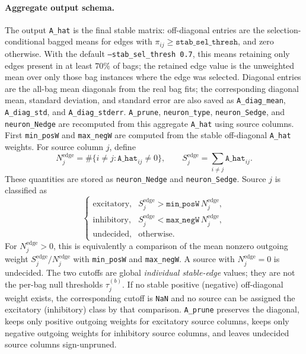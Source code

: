 \documentclass[11pt]{article}
\begin{document}
\paragraph{Aggregate output schema.}
The output \texttt{A\_hat} is the final stable matrix: off-diagonal entries
are the selection-conditional bagged means for edges with
\(\pi_{ij}\ge\texttt{stab\_sel\_thresh}\), and zero otherwise. With the default
\texttt{--stab\_sel\_thresh 0.7}, this means retaining only edges present in at least
\(70\%\) of bags; the retained edge value is the unweighted mean over only
those bag instances where the edge was selected. Diagonal entries are
the all-bag mean diagonals from the real bag fits; the corresponding
diagonal mean, standard deviation, and standard error are also saved as
\texttt{A\_diag\_mean}, \texttt{A\_diag\_std}, and
\texttt{A\_diag\_stderr}. \texttt{A\_prune}, \texttt{neuron\_type},
\texttt{neuron\_Sedge}, and \texttt{neuron\_Nedge} are recomputed from this
aggregate \texttt{A\_hat} using source columns. First \texttt{min\_posW} and
\texttt{max\_negW} are computed from the stable off-diagonal \texttt{A\_hat}
weights. For source column \(j\), define
\[
N^{\mathrm{edge}}_j
 = \#\{i\ne j:\texttt{A\_hat}_{ij}\ne0\},
\qquad
S^{\mathrm{edge}}_j
 = \sum_{i\ne j}\texttt{A\_hat}_{ij}.
\]
These quantities are stored as \texttt{neuron\_Nedge} and
\texttt{neuron\_Sedge}. Source \(j\) is classified as
\[
\begin{cases}
\text{excitatory}, &
S^{\mathrm{edge}}_j > \texttt{min\_posW}\,N^{\mathrm{edge}}_j,\\
\text{inhibitory}, &
S^{\mathrm{edge}}_j < \texttt{max\_negW}\,N^{\mathrm{edge}}_j,\\
\text{undecided}, & \text{otherwise}.
\end{cases}
\]
For \(N^{\mathrm{edge}}_j>0\), this is equivalently a comparison of the mean
nonzero outgoing weight \(S^{\mathrm{edge}}_j/N^{\mathrm{edge}}_j\) with
\texttt{min\_posW} and \texttt{max\_negW}. A source with
\(N^{\mathrm{edge}}_j=0\) is undecided. The two cutoffs are global
\emph{individual stable-edge} values; they are not the per-bag null
thresholds \(\tau_j^{(b)}\). If no stable positive (negative) off-diagonal
weight exists, the corresponding cutoff is \texttt{NaN} and no source can be
assigned the excitatory (inhibitory) class by that comparison.
\texttt{A\_prune} preserves the diagonal, keeps only positive outgoing
weights for excitatory source columns, keeps only negative outgoing weights
for inhibitory source columns, and leaves undecided source columns
sign-unpruned.
\end{document}
